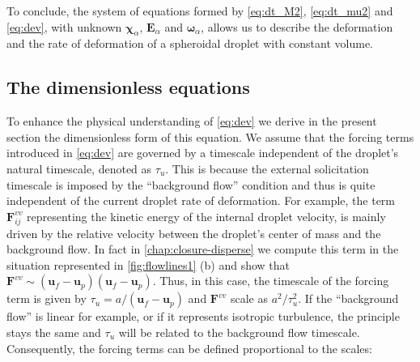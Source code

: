 To conclude, the system of equations formed by \ref{eq:dt_M2}, \ref{eq:dt_mu2} and \ref{eq:dev}, with unknown $\bm\chi_\alpha$, $\textbf{E}_\alpha$ and $\bm\omega_\alpha$, allows us to describe the deformation and the rate of deformation of a spheroidal droplet with constant volume.

\subsection{The dimensionless equations}


To enhance the physical understanding of \ref{eq:dev} we derive in the present section the dimensionless form of this equation. 
We assume that the forcing terms introduced in \ref{eq:dev} are governed by a timescale independent of the droplet's natural timescale, denoted as $\tau_u$. 
This is because the external solicitation timescale is imposed by the ``background flow'' condition and thus is quite independent of the current droplet rate of deformation. 
For example, the term $\textbf{F}_{ij}^{vv}$ representing the kinetic energy of the internal droplet velocity, is mainly driven by the relative velocity between the droplet's center of mass and the background flow. 
In fact in \ref{chap:closure-disperse} we compute this term in the situation represented in \ref{fig:flowlines1} (b) and show that $ \textbf{F}^{vv}\sim (\textbf{u}_f - \textbf{u}_p)(\textbf{u}_f - \textbf{u}_p)$. 
Thus, in this case, the timescale of the forcing term is given by $\tau_u = a /(\textbf{u}_f - \textbf{u}_p)$ and $\textbf{F}^{vv}$ scale as $a^2/\tau_u^2$. 
If the ``background flow'' is linear for example,  or if it represents isotropic turbulence, the principle stays the same and $\tau_u$ will be related to the background flow timescale. 
Consequently, the forcing terms can be defined proportional to the scales: 
